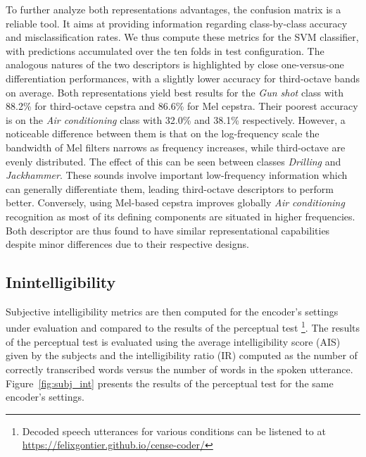 \documentclass[final,3p,times,twocolumn]{elsarticle}
\begin{document}
To further analyze both representations advantages, the confusion matrix is a reliable tool. It aims at providing information regarding class-by-class accuracy and misclassification rates. We thus compute these metrics for the SVM classifier, with predictions accumulated over the ten folds in test configuration. The analogous natures of the two descriptors is highlighted by close one-versus-one differentiation performances, with a slightly lower accuracy for third-octave bands on average. Both representations yield best results for the \textit{Gun shot} class with 88.2\% for third-octave cepstra and 86.6\% for Mel cepstra. Their poorest accuracy is on the \textit{Air conditioning} class with 32.0\% and 38.1\% respectively. However, a noticeable difference between them is that on the log-frequency scale the bandwidth of Mel filters narrows as frequency increases, while third-octave are evenly distributed. The effect of this can be seen between classes \textit{Drilling} and \textit{Jackhammer}. These sounds involve important low-frequency information which can generally differentiate them, leading third-octave descriptors to perform better. Conversely, using Mel-based cepstra improves globally \textit{Air conditioning} recognition as most of its defining components are situated in higher frequencies.\\

Both descriptor are thus found to have similar representational capabilities despite minor differences due to their respective designs.


\subsection{Inintelligibility}

Subjective intelligibility metrics are then computed for the encoder's settings under evaluation and compared to the results of the perceptual test \footnote{Decoded speech utterances for various conditions can be listened to at \url{https://felixgontier.github.io/cense-coder/}}. The results of the perceptual test is evaluated using the average intelligibility score (AIS) given by the subjects and the intelligibility ratio (IR) computed as the number of correctly transcribed words versus the number of words in the spoken utterance. Figure~\ref{fig:subj_int} presents the results of the perceptual test for the same encoder's settings.
\end{document}
